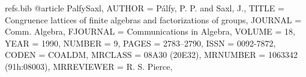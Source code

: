 \begin{filecontents*}{refs.bib}
@article {PalfySaxl,
    AUTHOR = {P{\'a}lfy, P. P. and Saxl, J.},
     TITLE = {Congruence lattices of finite algebras and factorizations of
              groups},
   JOURNAL = {Comm. Algebra},
  FJOURNAL = {Communications in Algebra},
    VOLUME = {18},
      YEAR = {1990},
    NUMBER = {9},
     PAGES = {2783--2790},
      ISSN = {0092-7872},
     CODEN = {COALDM},
   MRCLASS = {08A30 (20E32)},
  MRNUMBER = {1063342 (91h:08003)},
MRREVIEWER = {R. S. Pierce},
}
\end{filecontents*}

\documentclass{amsart}
\usepackage[style = ieee, urldate = comp]{biblatex}
%
%
\usepackage{amsmath}%
\usepackage{amsfonts}%
\usepackage{amssymb}%
\usepackage{mathrsfs}
\usepackage{stmaryrd,enumerate}
\usepackage{graphicx}
\usepackage{comment}
\usepackage{tikz}
\usepackage{xspace}
\usepackage[smaller]{acronym}%

[CIB]{commutative idempotent binar}
[CUBS]{compatible uniform block structure}
\newcommand{\cubs}{\acs{cubs}\xspace}
[PPPC]{pairwise-permuting pairwise-complements}
\newcommand{\pppc}{\acs{pppc}\xspace}



